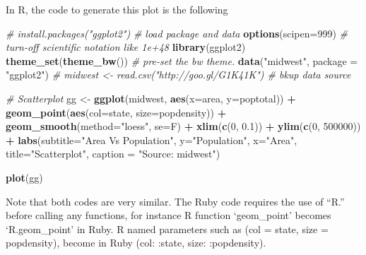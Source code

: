 \documentclass[]{article}
\newenvironment{Shaded}{\begin{snugshade}}{\end{snugshade}}
\newcommand{\KeywordTok}[1]{\textcolor[rgb]{0.13,0.29,0.53}{\textbf{#1}}}
\newcommand{\DataTypeTok}[1]{\textcolor[rgb]{0.13,0.29,0.53}{#1}}
\newcommand{\DecValTok}[1]{\textcolor[rgb]{0.00,0.00,0.81}{#1}}
\newcommand{\FloatTok}[1]{\textcolor[rgb]{0.00,0.00,0.81}{#1}}
\newcommand{\StringTok}[1]{\textcolor[rgb]{0.31,0.60,0.02}{#1}}
\newcommand{\CommentTok}[1]{\textcolor[rgb]{0.56,0.35,0.01}{\textit{#1}}}
\newcommand{\OperatorTok}[1]{\textcolor[rgb]{0.81,0.36,0.00}{\textbf{#1}}}
\newcommand{\NormalTok}[1]{#1}
\begin{document}
In R, the code to generate this plot is the following

\begin{Shaded}
\begin{Highlighting}[]
\CommentTok{# install.packages("ggplot2")}
\CommentTok{# load package and data}
\KeywordTok{options}\NormalTok{(}\DataTypeTok{scipen=}\DecValTok{999}\NormalTok{)  }\CommentTok{# turn-off scientific notation like 1e+48}
\KeywordTok{library}\NormalTok{(ggplot2)}
\KeywordTok{theme_set}\NormalTok{(}\KeywordTok{theme_bw}\NormalTok{())  }\CommentTok{# pre-set the bw theme.}
\KeywordTok{data}\NormalTok{(}\StringTok{"midwest"}\NormalTok{, }\DataTypeTok{package =} \StringTok{"ggplot2"}\NormalTok{)}
\CommentTok{# midwest <- read.csv("http://goo.gl/G1K41K")  # bkup data source}

\CommentTok{# Scatterplot}
\NormalTok{gg <-}\StringTok{ }\KeywordTok{ggplot}\NormalTok{(midwest, }\KeywordTok{aes}\NormalTok{(}\DataTypeTok{x=}\NormalTok{area, }\DataTypeTok{y=}\NormalTok{poptotal)) }\OperatorTok{+}\StringTok{ }
\StringTok{      }\KeywordTok{geom_point}\NormalTok{(}\KeywordTok{aes}\NormalTok{(}\DataTypeTok{col=}\NormalTok{state, }\DataTypeTok{size=}\NormalTok{popdensity)) }\OperatorTok{+}\StringTok{ }
\StringTok{      }\KeywordTok{geom_smooth}\NormalTok{(}\DataTypeTok{method=}\StringTok{"loess"}\NormalTok{, }\DataTypeTok{se=}\NormalTok{F) }\OperatorTok{+}\StringTok{ }
\StringTok{      }\KeywordTok{xlim}\NormalTok{(}\KeywordTok{c}\NormalTok{(}\DecValTok{0}\NormalTok{, }\FloatTok{0.1}\NormalTok{)) }\OperatorTok{+}\StringTok{ }
\StringTok{      }\KeywordTok{ylim}\NormalTok{(}\KeywordTok{c}\NormalTok{(}\DecValTok{0}\NormalTok{, }\DecValTok{500000}\NormalTok{)) }\OperatorTok{+}\StringTok{ }
\StringTok{      }\KeywordTok{labs}\NormalTok{(}\DataTypeTok{subtitle=}\StringTok{"Area Vs Population"}\NormalTok{, }
           \DataTypeTok{y=}\StringTok{"Population"}\NormalTok{, }
           \DataTypeTok{x=}\StringTok{"Area"}\NormalTok{, }
           \DataTypeTok{title=}\StringTok{"Scatterplot"}\NormalTok{, }
           \DataTypeTok{caption =} \StringTok{"Source: midwest"}\NormalTok{)}

\KeywordTok{plot}\NormalTok{(gg)}
\end{Highlighting}
\end{Shaded}

Note that both codes are very similar. The Ruby code requires the use of
``R.'' before calling any functions, for instance R function
`geom\_point' becomes `R.geom\_point' in Ruby. R named parameters such
as (col = state, size = popdensity), become in Ruby (col: :state, size:
:popdensity).
\end{document}
